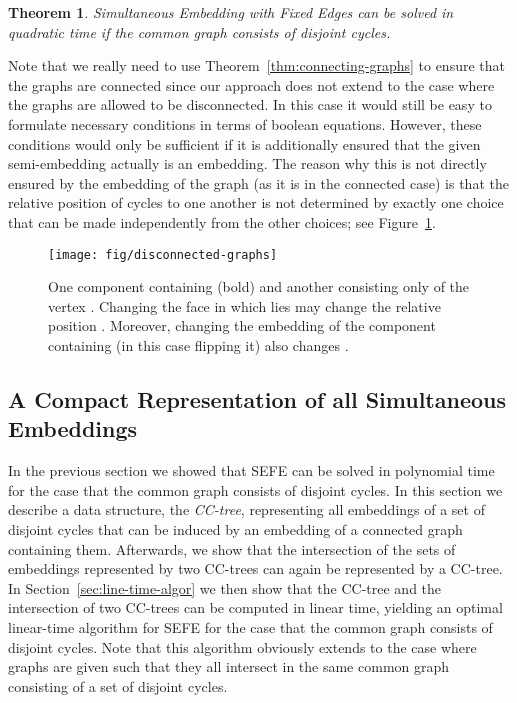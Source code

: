 \documentclass{scrartcl}
\newcommand{\1}[1]{{\normalfont \ensuremath{#1^{\tiny\circled{1}}}}} \newcommand{\2}[1]{{\normalfont \ensuremath{#1^{\tiny\circled{2}}}}} \renewcommand{\k}[1]{{\normalfont \ensuremath{#1^{\tiny\circled{k}}}}} \newcommand{\proj}[2]{\ensuremath{\left.#1\right|_{#2}}} \newcommand{\eps}{\varepsilon}
\theoremstyle{plain} \newtheorem{theorem}{Theorem} \newcounter{lemmacounter} \setcounter{lemmacounter}{0} \newtheorem{lemma}[lemmacounter]{Lemma} \newtheorem{fact}{Fact}  \newtheorem{corollary}{Corollary} \theoremstyle{definition} \newtheorem{definition}{Definition}
\begin{document}
\begin{theorem}
  {\sc Simultaneous Embedding with Fixed Edges} can be solved in
  quadratic time if the common graph consists of disjoint cycles.
\end{theorem}

Note that we really need to use Theorem~\ref{thm:connecting-graphs} to
ensure that the graphs are connected since our approach does not
extend to the case where the graphs are allowed to be disconnected.
In this case it would still be easy to formulate necessary conditions
in terms of boolean equations.  However, these conditions would only
be sufficient if it is additionally ensured that the given
semi-embedding actually is an embedding.  The reason why this is not
directly ensured by the embedding of the graph (as it is in the
connected case) is that the relative position of cycles to one another
is not determined by exactly one choice that can be made independently
from the other choices; see Figure~\ref{fig:disonnected-graphs}.

\begin{figure}
  \centering
  \texttt{[image: fig/disconnected-graphs]}
  \caption{One component containing  (bold) and another consisting
    only of the vertex .  Changing the face in which  lies may
    change the relative position .  Moreover, changing the
    embedding of the component containing  (in this case flipping
    it) also changes .}
  \label{fig:disonnected-graphs}
\end{figure}

\subsection{A Compact Representation of all Simultaneous Embeddings}
\label{sec:compact-rep}

In the previous section we showed that {\sc SEFE} can be solved in
polynomial time for the case that the common graph consists of
disjoint cycles.  In this section we describe a data structure, the
\emph{CC-tree}, representing all embeddings of a set of disjoint cycles that
can be induced by an embedding of a connected graph containing them.
Afterwards, we show that the intersection of the sets of embeddings
represented by two CC-trees can again be represented by a CC-tree.  In
Section~\ref{sec:line-time-algor} we then show that the CC-tree and
the intersection of two CC-trees can be computed in linear time,
yielding an optimal linear-time algorithm for {\sc SEFE} for the case
that the common graph consists of disjoint cycles.  Note that this
algorithm obviously extends to the case where  graphs  are given such that they all intersect in the same common graph
 consisting of a set of disjoint cycles.
\end{document}
